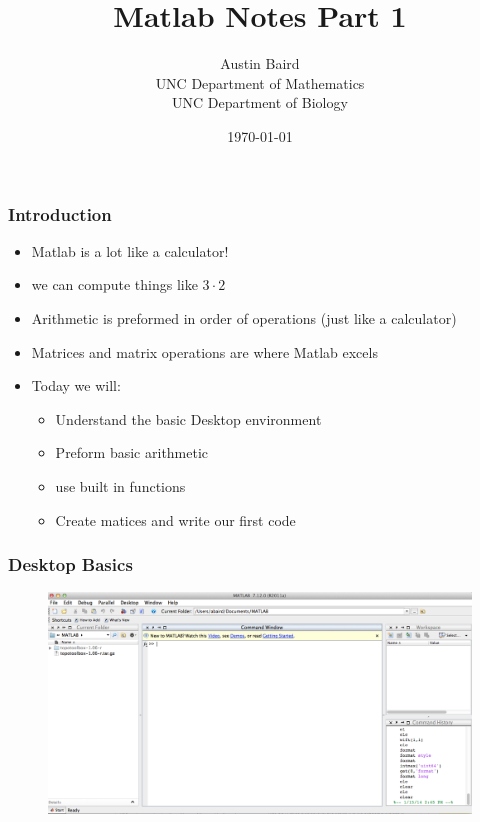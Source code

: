 \documentclass{beamer}
\title{ Matlab Notes Part 1}
\author{Austin Baird\\UNC Department of Mathematics\\UNC Department of Biology}
\date{\today}
\begin{document}
\frame{\titlepage}

\begin{frame}
\frametitle{Introduction}
\begin{itemize}
\item Matlab is a lot like a calculator! 
\item we can compute things like $ 3\cdot 2$ 
\item Arithmetic is preformed in order of operations (just like a calculator) 
\item Matrices and matrix operations are where Matlab excels
\item Today we will: 
\begin{itemize}
\item Understand the basic Desktop environment
\item Preform basic arithmetic
\item use built in functions
\item Create matices and write our first code
\end{itemize}

\end{itemize}
\end{frame}

\begin{frame}
\frametitle{Desktop Basics} 

\begin{figure}
\includegraphics[width=\textwidth, height= 0.8\textheight]{./pictures/display}
\end{figure}
\end{frame}

\end{document}
